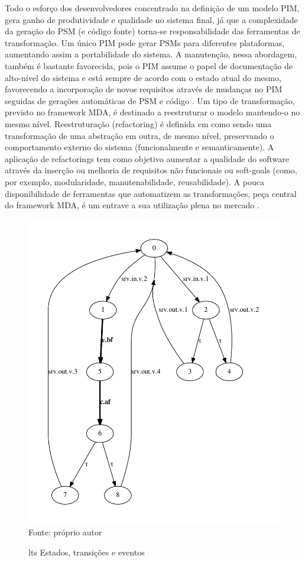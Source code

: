 	Todo o esforço dos desenvolvedores concentrado na definição de um modelo PIM, gera ganho de produtividade e qualidade no sistema final, já que a complexidade da geração do PSM (e código fonte) torna-se responsabilidade das ferramentas de transformação. Um único PIM pode gerar PSMs para diferentes plataformas, aumentando assim a portabilidade do sistema. A manutenção, nessa abordagem, também é bastante favorecida, pois o PIM assume o papel de documentação de alto-nível do sistema e está sempre de acordo com o estado atual do mesmo, favorecendo a incorporação de novos requisitos através de mudanças no PIM seguidas de gerações automáticas de PSM e código \citep{Frankel:2002}.
	Um tipo de transformação, previsto no framework MDA, é destinado a reestruturar o modelo mantendo-o no mesmo nível. Reestruturação (refactoring) é definida em como sendo uma transformação de uma abstração em outra, de mesmo nível, preservando o comportamento externo do sistema (funcionalmente e semanticamente). A aplicação de refactorings tem como objetivo aumentar a qualidade do software através da inserção ou melhoria de requisitos não funcionais ou soft-goals (como, por exemplo, modularidade, manutenabilidade, reusabilidade). A pouca disponibilidade de ferramentas que automatizem as transformações, peça central do framework MDA, é um entrave a sua utilização plena no mercado \citep{Frankel:2002}. 


\begin{figure}[htp]
\centering
  \caption[]{\ac{lts} Estados, transições e eventos}
  \includegraphics[width=\columnwidth]{imagens/P1andSRV-eps-converted-to.pdf}
  \footnotesize{Fonte: próprio autor}
  \label{fig:minha-imagem1}
\end{figure}

